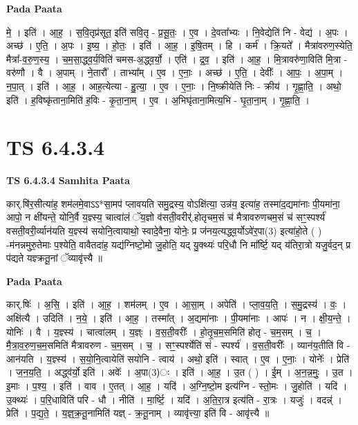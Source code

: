 \documentclass[17pt]{extarticle}
\begin{document}
\textbf{Pada Paata} \newline

मे॒ । इति॑ । आ॒ह॒ । स॒वि॒तृप्र॑सूत॒ इति॑ सवि॒तृ - प्र॒सू॒तः॒ । ए॒व । दे॒वता᳚भ्यः । नि॒वेद्येति॑ नि - वेद्य॑ । अ॒पः । अच्छ॑ । ए॒ति॒ । अ॒पः । इ॒ष्य॒ । हो॒तः॒ । इति॑ । आ॒ह॒ । इ॒षि॒तम् । हि । कर्म॑ । क्रि॒यते᳚ । मैत्रा॑वरुण॒स्येति॒ मैत्रा᳚-व॒रु॒ण॒स्य॒ । च॒म॒सा॒द्ध्व॒र्य॒विति॑ चमस-अ॒द्ध्व॒र्यो॒ । एति॑ । द्र॒व॒ । इति॑ । आ॒ह॒ । मि॒त्रावरु॑णा॒विति॑ मि॒त्रा - वरु॑णौ । वै । अ॒पाम् । ने॒तारौ᳚ । ताभ्या᳚म् । ए॒व । ए॒नाः॒ । अच्छ॑ । ए॒ति॒ । देवीः᳚ । आ॒पः॒ । अ॒पा॒म् । न॒पा॒त् । इति॑ । आ॒ह॒ । आह॒त्येत्या - हु॒त्या॒ । ए॒व । ए॒नाः॒ । नि॒ष्क्रीयेति॑ निः - क्रीय॑ । गृ॒ह्णा॒ति॒ । अथो॒ इति॑ । ह॒विष्कृ॑ताना॒मिति॑ ह॒विः - कृ॒ता॒ना॒म् । ए॒व । अ॒भिघृ॑ताना॒मित्य॒भि - घृ॒ता॒ना॒म् । गृ॒ह्णा॒ति॒ ।  \newline





\section{ TS 6.4.3.4 }

\textbf{TS 6.4.3.4 } \newline
\textbf{Samhita Paata} \newline

कार्.षि॑र॒सीत्या॑ह॒ शम॑लमे॒वाऽऽ*सा॒मप॑ प्लावयति समु॒द्रस्य॒ वोऽक्षि॑त्या॒ उन्न॑य॒ इत्या॑ह॒ तस्मा॑द॒द्यमा॑नाः पी॒यमा॑ना॒ आपो॒ न क्षी॑यन्ते॒ योनि॒र्वै य॒ज्ञ्स्य॒ चात्वा॑लं ॅय॒ज्ञो व॑सती॒वरीर्॑.होतृचम॒सं च॑ मैत्रावरुणचम॒सं च॑ सꣳ॒॒स्पर्श्य॑ वसती॒वरी॒र्व्यान॑यति य॒ज्ञ्स्य॑ सयोनि॒त्वायाथो॒ स्वादे॒वैना॒ योनेः॒ प्र ज॑नय॒त्यद्ध्व॒र्योऽवे॑र॒पा(3) इत्या॑हो॒ते ( ) -म॑नन्नमुरु॒तेमाः प॒श्येति॒ वावैतदा॑ह॒ यद्य॑ग्निष्टो॒मो जु॒होति॒ यद् यु॒क्थ्यः॑ परि॒धौ नि मा᳚र्ष्टि॒ यद् य॑तिरा॒त्रो यजु॒र्वद॒न् प्र प॑द्यते यज्ञ्क्रतू॒नां ॅव्यावृ॑त्त्यै ॥ \newline

\textbf{Pada Paata} \newline

कार्.षिः॑ । अ॒सि॒ । इति॑ । आ॒ह॒ । शम॑लम् । ए॒व । आ॒सा॒म् । अपेति॑ । प्ला॒व॒य॒ति॒ । स॒मु॒द्रस्य॑ । वः॒ । अक्षि॑त्यै । उदिति॑ । न॒ये॒ । इति॑ । आ॒ह॒ । तस्मा᳚त् । अ॒द्यमा॑नाः । पी॒यमा॑नाः । आपः॑ । न । क्षी॒य॒न्ते॒ । योनिः॑ । वै । य॒ज्ञ्स्य॑ । चात्वा॑लम् । य॒ज्ञ्ः । व॒स॒ती॒वरीः᳚ । हो॒तृ॒च॒म॒समिति॑ होतृ - च॒म॒सम् । च॒ । मै॒त्रा॒व॒रु॒ण॒च॒म॒समिति॑ मैत्रावरुण - च॒म॒सम् । च॒ । सꣳ॒॒स्पर्श्येति॑ सं - स्पर्श्य॑ । व॒स॒ती॒वरीः᳚ । व्यान॑य॒तीति॑ वि - आन॑यति । य॒ज्ञ्स्य॑ । स॒यो॒नि॒त्वायेति॑ सयोनि - त्वाय॑ । अथो॒ इति॑ । स्वात् । ए॒व । ए॒नाः॒ । योनेः᳚ । प्रेति॑ । ज॒न॒य॒ति॒ । अद्ध्व॑र्यो॒ इति॑ । अवेः᳚ । अ॒पा(3)ः । इति॑ । आ॒ह॒ । उ॒त ( ) । ई॒म् । अ॒न॒न्न॒मुः॒ । उ॒त । इ॒माः । प॒श्य॒ । इति॑ । वाव । ए॒तत् । आ॒ह॒ । यदि॑ । अ॒ग्नि॒ष्टो॒म इत्य॑ग्नि - स्तो॒मः । जु॒होति॑ । यदि॑ । उ॒क्थ्यः॑ । प॒रि॒धाविति॑ परि - धौ । नीति॑ । मा॒र्ष्टि॒ । यदि॑ । अ॒ति॒रा॒त्र इत्य॑ति - रा॒त्रः । यजुः॑ । वदन्न्॑ । प्रेति॑ । प॒द्य॒ते॒ । य॒ज्ञ्॒क्र॒तू॒नामिति॑ यज्ञ् - क्र॒तू॒नाम् । व्यावृ॑त्त्या॒ इति॑ वि - आवृ॑त्त्यै ॥  \newline
\end{document}
